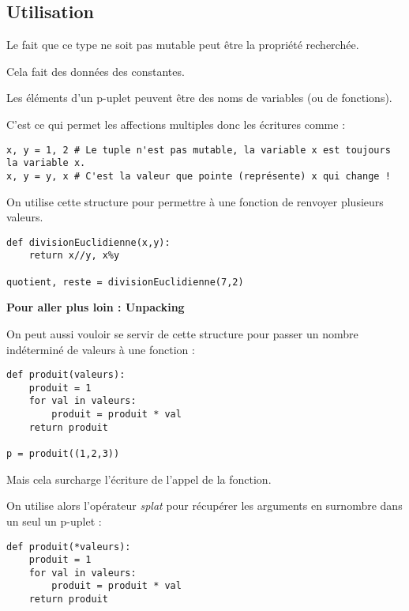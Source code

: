 {\subsection{Utilisation}

Le fait que ce type ne soit pas mutable peut être la propriété recherchée. 

Cela fait des données des constantes.

\medskip

Les éléments d'un p-uplet peuvent être des noms de variables (ou de fonctions). 

C'est ce qui permet les affections multiples donc les écritures comme :

\vspace{-2ex}
\begin{verbatim}
x, y = 1, 2 # Le tuple n'est pas mutable, la variable x est toujours la variable x.
x, y = y, x # C'est la valeur que pointe (représente) x qui change !
\end{verbatim}

\medskip

On utilise cette structure pour permettre à une fonction de renvoyer plusieurs valeurs.

\vspace{-2ex}
\begin{verbatim}
def divisionEuclidienne(x,y):
    return x//y, x%y
    
quotient, reste = divisionEuclidienne(7,2)
\end{verbatim}


\medskip
{\bfseries Pour aller plus loin : Unpacking}

On peut aussi vouloir se servir de cette structure pour passer un nombre indéterminé de valeurs à une fonction : 

\vspace{-2ex}
\begin{verbatim}
def produit(valeurs):
    produit = 1
    for val in valeurs:
        produit = produit * val
    return produit

p = produit((1,2,3))
\end{verbatim}

Mais cela surcharge l'écriture de l'appel de la fonction.

On utilise alors l'opérateur \emph{splat} \pythoninline{*} pour récupérer les arguments en surnombre dans un seul un p-uplet :

\vspace{-2ex}
\begin{verbatim}
def produit(*valeurs):
    produit = 1
    for val in valeurs:
        produit = produit * val
    return produit


\end{verbatim}}
